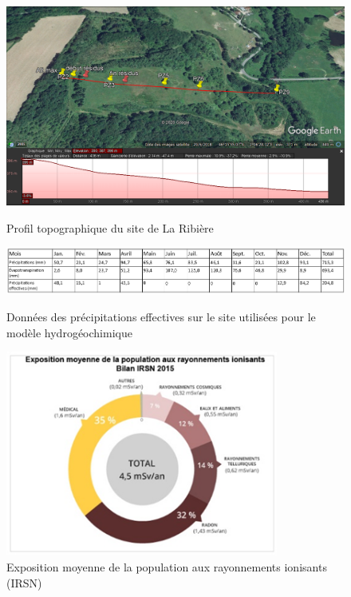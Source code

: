 \documentclass{article}
\begin{document}
\begin{figure}[H]
 \centering
        \includegraphics[width = \textwidth]{plan_coupe_google_earth.png} 
        \label{fig:earth_ribière}
        \caption{Profil topographique du site de La Ribière}
\end{figure}
\begin{figure}[H]
 \centering
        \includegraphics[width = \textwidth]{III_B_3_5.png} 
        \label{fig:precipitations_tableau_ribière}
        \caption{Données des précipitations effectives sur le site utilisées pour le modèle hydrogéochimique}
\end{figure}
\begin{figure}[H]
    \centering
    \includegraphics[width=0.8\textwidth]{II_A2_4.png}
    \caption{Exposition moyenne de la population aux rayonnements ionisants (IRSN)}
    \label{fig:exposition_moyenne}
\end{figure}
\end{document}
